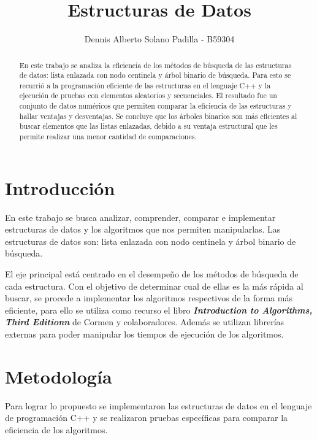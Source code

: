 \documentclass[twocolumn,english,spanish,journal]{IEEEtran}
\begin{document}
	
	

\title{Estructuras de Datos}
\author{Dennis Alberto Solano Padilla - B59304}
\maketitle

\begin{abstract}
	En este trabajo se analiza la eficiencia de los métodos de búsqueda de las estructuras de datos: lista enlazada con nodo centinela y árbol binario de búsqueda. Para esto se recurrió a la programación eficiente de las estructuras en el lenguaje C++ y la ejecución de pruebas con elementos aleatorios y secuenciales. El resultado fue un conjunto de datos numéricos que permiten comparar la eficiencia de las estructuras y hallar ventajas y desventajas. Se concluye que los árboles binarios son más eficientes al buscar elementos que las listas enlazadas, debido a su ventaja estructural que les permite realizar una menor cantidad de comparaciones.
\end{abstract}

\section{Introducción}
En este trabajo se busca analizar, comprender, comparar e implementar estructuras de datos y los algoritmos que nos permiten manipularlas.
Las estructuras de datos son: lista enlazada con nodo centinela y árbol binario de búsqueda.\newline

El eje principal está centrado en el desempeño de los métodos de búsqueda de cada estructura.
Con el objetivo de determinar cual de ellas es la más rápida al buscar, se procede a implementar los algoritmos respectivos de la forma más eficiente, para ello se utiliza como recurso el libro \textbf{\textit{Introduction to Algorithms, Third Editionn }} de Cormen y colaboradores. Además se utilizan librerías externas para poder manipular los tiempos de ejecución de los algoritmos.

\section{Metodología}
Para lograr lo propuesto se implementaron las estructuras de datos en el lenguaje de programación C++ y se realizaron pruebas específicas para comparar la eficiencia de los 
algoritmos.\newline
\end{document}
